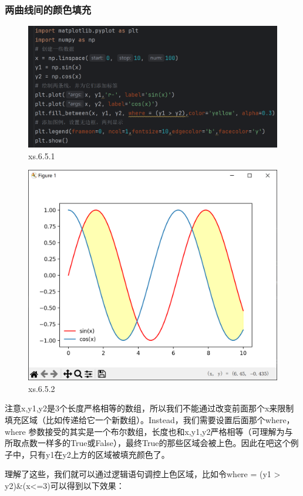 \documentclass[12pt]{article}
\begin{document}
\subsubsection{两曲线间的颜色填充}


\begin{figure}[H]
    \centering
    \includegraphics[width=1\linewidth]{曲线间颜色填充 program1.png}
    \caption{xs.6.5.1}
    \label{fig:enter-label}
\end{figure}
\begin{figure}[H]
    \centering
    \includegraphics[width=0.6\linewidth]{曲线间颜色填充 Pic1.png}
    \caption{xs.6.5.2}
    \label{fig:enter-label}
\end{figure}
注意x,y1,y2是3个长度严格相等的数组，所以我们不能通过改变前面那个x来限制填充区域（比如传递给它一个新数组）。Instead，我们需要设置后面那个where，where   参数接受的其实是一个布尔数组，长度也和x,y1,y2严格相等（可理解为与所取点数一样多的True或False），最终True的那些区域会被上色。因此在吧这个例子中，只有y1在y2上方的区域被填充颜色了。

理解了这些，我们就可以通过逻辑语句调控上色区域，比如令where = (y1 > y2)\&(x<=3)可以得到以下效果：
\end{document}
